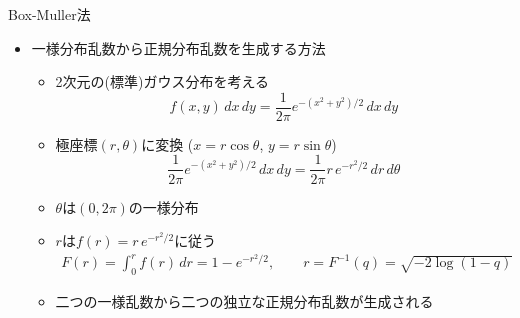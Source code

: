 
\begin{frame}[t,fragile]{Box-Muller法}
  \begin{itemize}
  \item 一様分布乱数から正規分布乱数を生成する方法
    \begin{itemize}
    \item 2次元の(標準)ガウス分布を考える
      \[
      f(x,y)\,dx\,dy= \frac{1}{2\pi} e^{-(x^2+y^2)/2} \,dx\,dy
      \]
    \item 極座標$(r,\theta)$に変換 ($x=r\cos\theta$, $y=r\sin\theta$)
      \[
      \frac{1}{2\pi} e^{-(x^2+y^2)/2} \,dx\,dy = \frac{1}{2\pi} r \, e^{-r^2/2} \,dr\,d\theta
      \]
    \item $\theta$は$(0,2\pi)$の一様分布
    \item $r$は$f(r) = r \, e^{-r^2/2}$に従う
      \begin{align*}
        F(r) = \int_0^r f(r) \, dr = 1 - e^{-r^2/2}, \qquad r = F^{-1}(q) = \sqrt{- 2 \log(1-q)}
      \end{align*}
    \item 二つの一様乱数から二つの独立な正規分布乱数が生成される
    \end{itemize}
  \end{itemize}
\end{frame}
